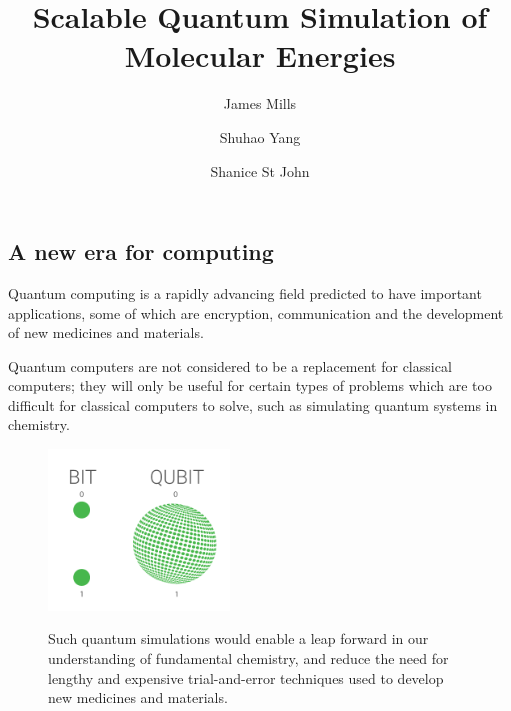 \documentclass[14pt,landscape,color=UCLdarkred,margin=3cm]{uclposter}
\title{Scalable Quantum Simulation of Molecular Energies}
\author{James Mills}
\author{Shuhao Yang}
\author{Shanice St John}
\affil[1]{MSc Quantum Technologies, UCL}
\begin{document}
\large

\maketitle

\begin{multicols}{3}

\section*{A new era for computing}


Quantum computing is a rapidly advancing field predicted to have important applications, some of which are encryption, communication and the development of new medicines and materials. 

Quantum computers are not considered to be a replacement for classical computers; they will only be useful for certain types of problems which are too difficult for classical computers to solve, such as simulating quantum systems in chemistry.
\\
\begin{figure}[H]
  \begin{center}
\setlength{\fboxsep}{0.5em}
  \begin{minipage}[c]{12em}
  \begin{center}
  \includegraphics[width=13em]{QUBIT.png}
  \end{center}
    
  \end{minipage}
  \qquad
  \begin{minipage}[c]{26em}
  \large

Such quantum simulations would enable a leap forward in our understanding of fundamental chemistry, and reduce the need for lengthy and expensive trial-and-error techniques used to develop new medicines and materials.
  \end{minipage}
  \end{center}
\end{figure}

\end{multicols}
\end{document}
